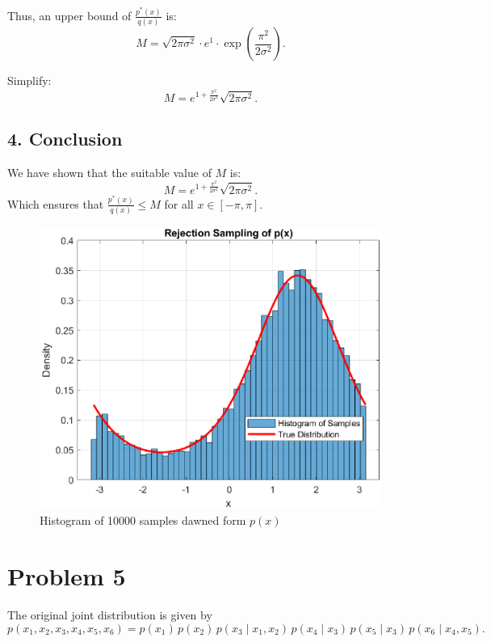\documentclass{article}
\begin{document}
Thus, an upper bound of \(\frac{p^*(x)}{q(x)}\) is:
\[
M = \sqrt{2\pi\sigma^2} \cdot e^1 \cdot \exp\left(\frac{\pi^2}{2\sigma^2}\right).
\]

Simplify:
\[
M = e^{1 + \frac{\pi^2}{2\sigma^2}} \sqrt{2\pi\sigma^2}.
\]

\subsection*{4. Conclusion}
We have shown that the suitable value of \(M\) is:
\[
M = e^{1 + \frac{\pi^2}{2\sigma^2}} \sqrt{2\pi\sigma^2}.
\]
Which ensures that \(\frac{p^*(x)}{q(x)} \leq M\) for all \(x \in [-\pi, \pi]\).


\begin{figure}[H]
    \centering
    \includegraphics[width=\textwidth]{HW8_P4_rejection_sampling.eps}     
    \caption{Histogram of 10000 samples dawned form $p(x)$}
\end{figure}


\section*{Problem 5}

The original joint distribution is given by
\begin{equation}
    p(x_1, x_2, x_3, x_4, x_5, x_6) = p(x_1)\,p(x_2)\,p(x_3 \mid x_1, x_2)\,p(x_4 \mid x_3)\,p(x_5 \mid x_3)\,p(x_6 \mid x_4, x_5).
\end{equation}
\end{document}
